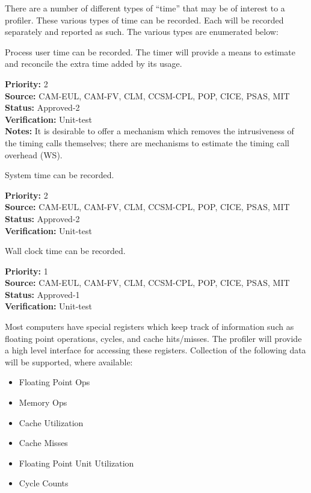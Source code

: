 
There are
a number of different types of ``time'' that may be of interest to a profiler.
These various types of time can be recorded.  Each will be recorded separately and reported
as such.  The various types are enumerated below:


Process user time can be recorded.
The timer will provide a means to estimate and reconcile the extra time added by its usage.

\begin{reqlist}
{\bf Priority:} 2 \\
{\bf Source:} CAM-EUL, CAM-FV, CLM, CCSM-CPL, POP, CICE, PSAS, MIT \\
{\bf Status:} Approved-2 \\
{\bf Verification:} Unit-test \\
{\bf Notes:} It is desirable to offer a mechanism which removes the
  intrusiveness of the timing calls themselves; there are mechanisms
  to estimate the timing call overhead (WS).
  
\end{reqlist}


System time can be recorded.

\begin{reqlist}
{\bf Priority:} 2 \\
{\bf Source:} CAM-EUL, CAM-FV, CLM, CCSM-CPL, POP, CICE, PSAS, MIT \\
{\bf Status:} Approved-2 \\
{\bf Verification:} Unit-test 
\end{reqlist}



Wall clock time can be recorded.

\begin{reqlist}
{\bf Priority:} 1 \\
{\bf Source:} CAM-EUL, CAM-FV, CLM, CCSM-CPL, POP, CICE, PSAS, MIT \\
{\bf Status:} Approved-1 \\
{\bf Verification:} Unit-test 
\end{reqlist}



Most computers have special registers which keep track of information such
as floating point operations, cycles, and cache hits/misses.  The profiler will
provide a high level interface for accessing these registers.
Collection of the following data will be supported, where available:
\begin{itemize}
\item{Floating Point Ops}
\item{Memory Ops}
\item{Cache Utilization}
\item{Cache Misses}
\item{Floating Point Unit Utilization}
\item{Cycle Counts}
\end{itemize}

